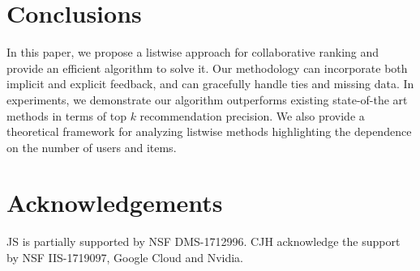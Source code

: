 \documentclass{article}
\begin{document}
\vspace{-10pt}\begin{table}[th]
\caption{Comparing different $k$ on Movielens1m data set using 50 training data per user.}
\label{explicit-ml1m-topk}
\vskip 0.15in
\begin{center}
\begin{small}
\begin{sc}
\vspace{-15pt}
\end{sc}
\end{small}
\end{center}
\vskip -0.2in
\end{table}

\section{Conclusions}
In this paper, we propose a listwise approach for collaborative ranking and provide
an efficient algorithm to solve it. 
Our methodology can incorporate both implicit and explicit feedback, and can gracefully handle ties and missing data. 
In experiments, we demonstrate our algorithm outperforms existing state-of-the art methods in terms of top $k$ recommendation precision. 
We also provide a theoretical framework for analyzing listwise methods highlighting the dependence on the number of users and items. 

\newpage

\section*{Acknowledgements}

JS is partially supported by NSF DMS-1712996. CJH acknowledge the support by NSF IIS-1719097, Google Cloud and Nvidia. \\
\end{document}
